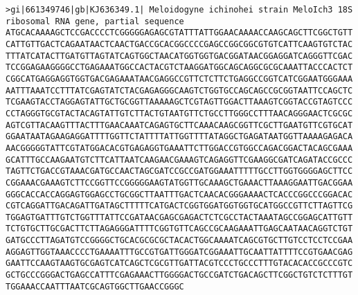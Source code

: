 \documentclass[11pt]{article}
\begin{document}
\begin{Verbatim}[commandchars=\\\{\}]
>gi|661349746|gb|KJ636349.1| Meloidogyne ichinohei strain MeloIch3 18S ribosomal RNA gene, partial sequence
ATGCACAAAAGCTCCGACCCCTCGGGGGAGAGCGTATTTATTGGAACAAAACCAAGCAGCTTCGGCTGTT
CATTGTTGACTCAGAATAACTCAACTGACCGCACGGCCCCGAGCCGGCGGCGTGTCATTCAAGTGTCTAC
TTTATCATACTTGATGTTAGTATCAGTGGCTAACATGGTGGTGACGGATAACGGAGGATCAGGGTTCGAC
TCCGGAGAAGGGGCCTGAGAAATGGCCACTACGTCTAAGGATGGCAGCAGGCGCGCAAATTACCCACTCT
CGGCATGAGGAGGTGGTGACGAGAAATAACGAGGCCGTTCTCTTCTGAGGCCGGTCATCGGAATGGGAAA
AATTTAAATCCTTTATCGAGTATCTACGAGAGGGCAAGTCTGGTGCCAGCAGCCGCGGTAATTCCAGCTC
TCGAAGTACCTAGGAGTATTGCTGCGGTTAAAAAGCTCGTAGTTGGACTTAAAGTCGGTACCGTAGTCCC
CCTAGGGTGCGTACTACAGTATTGTCTTACTGTAATGTTCTGCCTTGGGCCTTTAACAGGGAACTCGCGC
AGTCGTTACAAGTTTACTTTGAACAAATCAGAGTGCTTCAAACAAGCGGTTCGCTTGAATGTTCGTGCAT
GGAATAATAGAAGAGGATTTTGGTTCTATTTTATTGGTTTTATAGGCTGAGATAATGGTTAAAAGAGACA
AACGGGGGTATTCGTATGGACACGTGAGAGGTGAAATTCTTGGACCGTGGCCAGACGGACTACAGCGAAA
GCATTTGCCAAGAATGTCTTCATTAATCAAGAACGAAAGTCAGAGGTTCGAAGGCGATCAGATACCGCCC
TAGTTCTGACCGTAAACGATGCCAACTAGCGATCCGCCGATGGAAATTTTTGCCTTGGTGGGGAGCTTCC
CGGAAACGAAAGTCTTCCGGTTCCGGGGGAAGTATGGTTGCAAAGCTGAAACTTAAAGGAATTGACGGAA
GGGCACCACCAGGAGTGGAGCCTGCGGCTTAATTTGACTCAACACGGGAAAACTCACCCGGCCCGGACAC
CGTCAGGATTGACAGATTGATAGCTTTTTCATGACTCGGTGGATGGTGGTGCATGGCCGTTCTTAGTTCG
TGGAGTGATTTGTCTGGTTTATTCCGATAACGAGCGAGACTCTCGCCTACTAAATAGCCGGAGCATTGTT
TCTGTGCTTGCGACTTCTTAGAGGGATTTTCGGTGTTCAGCCGCAAGAAATTGAGCAATAACAGGTCTGT
GATGCCCTTAGATGTCCGGGGCTGCACGCGCGCTACACTGGCAAAATCAGCGTGCTTGTCCTCCTCCGAA
AGGAGTTGGTAAACCCCTGAAAATTTGCCGTGATTGGGATCGGAAATTGCAATTATTTTCCGTGAACGAG
GAATTCCAAGTAAGTGCGAGTCATCAGCTCGCGTTGATTACGTCCCTGCCCTTTGTACACACCGCCCGTC
GCTGCCCGGGACTGAGCCATTTCGAGAAACTTGGGGACTGCCGATCTGACAGCTTCGGCTGTCTCTTTGT
TGGAAACCAATTTAATCGCAGTGGCTTGAACCGGGC


\end{Verbatim}
\end{document}
